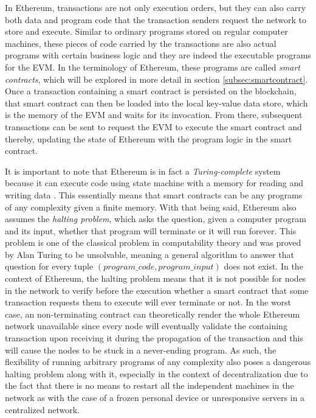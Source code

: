 In Ethereum, transactions are not only execution orders, but they can also carry both data and program code that the transaction senders request the network to store and execute. Similar to ordinary programs stored on regular computer machines, these pieces of code carried by the transactions are also actual programs with certain business logic and they are indeed the executable programs for the EVM. In the terminology of Ethereum, these programs are called \textit{smart contracts}, which will be explored in more detail in section \ref{subsec:smartcontract}. Once a transaction containing a smart contract is persisted on the blockchain, that smart contract can then be loaded into the local key-value data store, which is the memory of the EVM and waits for its invocation. From there, subsequent transactions can be sent to request the EVM to execute the smart contract and thereby, updating the state of Ethereum with the program logic in the smart contract. 


It is important to note that Ethereum is in fact a \textit{Turing-complete} system because it can execute code using state machine with a memory for reading and writing data \cite{antonopoulos2018mastering}. This essentially means that smart contracts can be any programs of any complexity given a finite memory. With that being said, Ethereum also assumes the \textit{halting problem}, which asks the question, given a computer program and its input, whether that program will terminate or it will run forever. This problem is one of the classical problem in computability theory and was proved by Alan Turing to be unsolvable, meaning a general algorithm to answer that question for every tuple $(program\_code, program\_input)$ does not exist. In the context of Ethereum, the halting problem means that it is not possible for nodes in the network to verify before the execution whether a smart contract that some transaction requests them to execute will ever terminate or not. In the worst case, an non-terminating contract can theoretically render the whole Ethereum network unavailable since every node will eventually validate the containing transaction upon receiving it during the propagation of the transaction and this will cause the nodes to be stuck in a never-ending program. As such, the flexibility of running arbitrary programs of any complexity also poses a dangerous halting problem along with it, especially in the context of decentralization due to the fact that there is no means to restart all the independent machines in the network as with the case of a frozen personal device or unresponsive servers in a centralized network.

